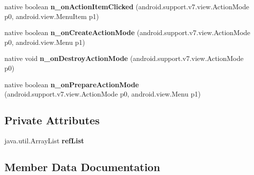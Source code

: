 \begin{DoxyCompactItemize}
native boolean {\bfseries n\+\_\+on\+Action\+Item\+Clicked} (android.\+support.\+v7.\+view.\+Action\+Mode p0, android.\+view.\+Menu\+Item p1)
\item 
\mbox{\label{classmd5b60ffeb829f638581ab2bb9b1a7f4f3f_1_1CellAdapter_aa35d121a32d8f37e712467c591e1e051}} 
native boolean {\bfseries n\+\_\+on\+Create\+Action\+Mode} (android.\+support.\+v7.\+view.\+Action\+Mode p0, android.\+view.\+Menu p1)
\item 
\mbox{\label{classmd5b60ffeb829f638581ab2bb9b1a7f4f3f_1_1CellAdapter_aebfeb57150c2efac7eaeeb5271f7a5fa}} 
native void {\bfseries n\+\_\+on\+Destroy\+Action\+Mode} (android.\+support.\+v7.\+view.\+Action\+Mode p0)
\item 
\mbox{\label{classmd5b60ffeb829f638581ab2bb9b1a7f4f3f_1_1CellAdapter_a8a9bdd2e1b8da9b7efff9f1252e170d3}} 
native boolean {\bfseries n\+\_\+on\+Prepare\+Action\+Mode} (android.\+support.\+v7.\+view.\+Action\+Mode p0, android.\+view.\+Menu p1)
\end{DoxyCompactItemize}
\subsection*{Private Attributes}
\begin{DoxyCompactItemize}
\item 
\mbox{\label{classmd5b60ffeb829f638581ab2bb9b1a7f4f3f_1_1CellAdapter_a954a374de657ac52ab7febec23bbae94}} 
java.\+util.\+Array\+List {\bfseries ref\+List}
\end{DoxyCompactItemize}


\subsection{Member Data Documentation}
\mbox{\label{classmd5b60ffeb829f638581ab2bb9b1a7f4f3f_1_1CellAdapter_abe33e45a7b887b1383f9c0ebda43ef00}} 
